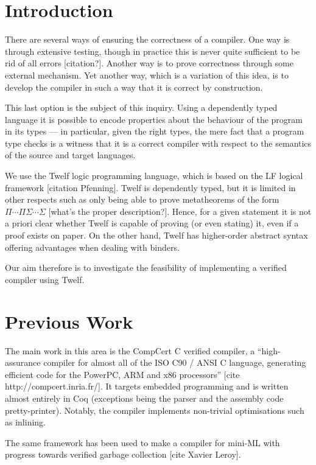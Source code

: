 \documentclass[12pt]{article}
\begin{document}
\section*{Introduction}

There are several ways of ensuring the correctness of a compiler.
One way is through extensive testing, though in practice this is never quite sufficient to be rid of all errors [citation?].
Another way is to prove correctness through some external mechanism.
Yet another way, which is a variation of this idea, is to develop the compiler in such a way that it is correct by construction.

This last option is the subject of this inquiry.
Using a dependently typed language it is possible to encode properties about the behaviour of the program in its types --- in particular, given the right types, the mere fact that a program type checks is a witness that it is a correct compiler with respect to the semantics of the source and target languages.

We use the Twelf logic programming language, which is based on the LF logical framework [citation Pfenning].
Twelf is dependently typed, but it is limited in other respects such as only being able to prove metatheorems of the form $\Pi \cdots \Pi \Sigma \cdots \Sigma$ [what's the proper description?].
Hence, for a given statement it is not a priori clear whether Twelf is capable of proving (or even stating) it, even if a proof exists on paper.
On the other hand, Twelf has higher-order abstract syntax offering advantages when dealing with binders.

Our aim therefore is to investigate the feasibility of implementing a verified compiler using Twelf.

\section*{Previous Work}

The main work in this area is the CompCert C verified compiler, a ``high-assurance compiler for almost all of the ISO C90 / ANSI C language, generating efficient code for the PowerPC, ARM and x86 processors'' [cite http://compcert.inria.fr/].
It targets embedded programming and is written almost entirely in Coq (exceptions being the parser and the assembly code pretty-printer).
Notably, the compiler implements non-trivial optimisations such as inlining.

The same framework has been used to make a compiler for mini-ML with progress towards verified garbage collection [cite Xavier Leroy].
\end{document}
